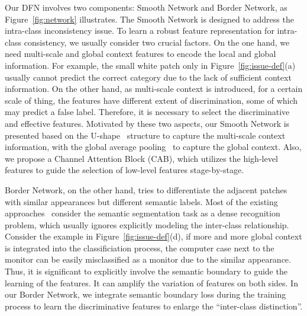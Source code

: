 \documentclass[10pt,twocolumn,letterpaper]{article}
\begin{document}
Our DFN involves two components: Smooth Network and Border Network, as Figure~\ref{fig:network} illustrates. The Smooth Network is designed to address the intra-class inconsistency issue. To learn a robust feature representation for intra-class consistency, we usually consider two crucial factors. On the one hand, we need multi-scale and global context features to encode the local and global information. For example, the small white patch only in Figure~\ref{fig:issue-def}(a) usually cannot predict the correct category due to the lack of sufficient context information. On the other hand, as multi-scale context is introduced, for a certain scale of thing, the features have different extent of discrimination, some of which may predict a false label. Therefore, it is necessary to select the discriminative and effective features. Motivated by these two aspects, our Smooth Network is presented based on the U-shape~\cite{Peng-CVPR-Largekernl-2017, Lin-CVPR-Refinenet-2017, Ronneberger-ICCV-U-net-2015, Ghiasi-ECCV-LRR-2016, Xie-ICCV-HEAD-2015} structure to capture the multi-scale context information, with the global average pooling~\cite{Lin-ICLR-NIN-2013, Liu-ICLR-ParseNet-2016, Zhao-CVPR-PSPNet-2017, Chen-Arxiv-Deeplabv3-2017} to capture the global context. Also, we propose a Channel Attention Block (CAB), which utilizes the high-level features to guide the selection of low-level features stage-by-stage.  

Border Network, on the other hand, tries to differentiate the adjacent patches with similar appearances but different semantic labels. Most of the existing approaches~\cite{Liu-ICLR-ParseNet-2016, Zhao-CVPR-PSPNet-2017, Chen-Arxiv-Deeplabv3-2017, Peng-CVPR-Largekernl-2017} consider the semantic segmentation task as a dense recognition problem, which usually ignores explicitly modeling the inter-class relationship. Consider the example in Figure~\ref{fig:issue-def}(d), if more and more global context is integrated into the classificiation process, the computer case next to the monitor can be easily misclassified as a monitor due to the similar appearance. Thus, it is significant to explicitly involve the semantic boundary to guide the learning of the features. It can amplify the variation of features on both sides. In our Border Network, we integrate semantic boundary loss during the training process to learn the discriminative features to enlarge the ``inter-class distinction''.  
\end{document}
